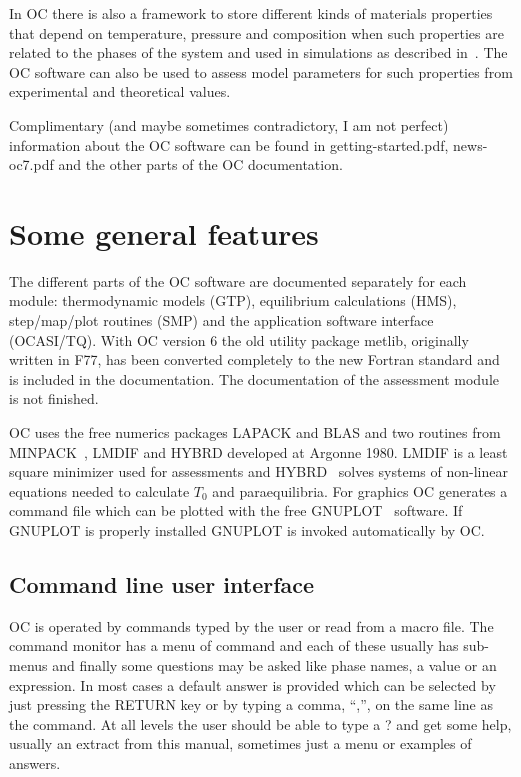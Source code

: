 \documentclass[11pt]{article}
\begin{document}
In OC there is also a framework to store different kinds of materials
properties that depend on temperature, pressure and composition when
such properties are related to the phases of the system and used in
simulations as described in~\cite{20Her}.  The OC software can also be
used to assess model parameters for such properties from experimental
and theoretical values.

Complimentary (and maybe sometimes contradictory, I am not perfect)
information about the OC software can be found in getting-started.pdf,
news-oc7.pdf and the other parts of the OC documentation.

\section{Some general features}

The different parts of the OC software are documented separately for
each module: thermodynamic models (GTP), equilibrium calculations
(HMS), step/map/plot routines (SMP) and the application software
interface (OCASI/TQ).  With OC version 6 the old utility package
metlib, originally written in F77, has been converted completely to
the new Fortran standard and is included in the documentation.  The
documentation of the assessment module is not finished.

OC uses the free numerics packages LAPACK and BLAS and two routines
from MINPACK~\cite{lmdif}, LMDIF and HYBRD developed at Argonne 1980.
LMDIF is a least square minimizer used for assessments and
HYBRD~\cite{lmdif} solves systems of non-linear equations needed to
calculate $T_0$ and paraequilibria.  For graphics OC generates a
command file which can be plotted with the free GNUPLOT~\cite{gnuplot}
software.  If GNUPLOT is properly installed GNUPLOT is invoked
automatically by OC.

\subsection{Command line user interface}

OC is operated by commands typed by the user or read from a macro
file.  The command monitor has a menu of command and each of these
usually has sub-menus and finally some questions may be asked like
phase names, a value or an expression.  In most cases a default answer
is provided which can be selected by just pressing the RETURN key or
by typing a comma, ``,'', on the same line as the command.  At all
levels the user should be able to type a ? and get some help, usually
an extract from this manual, sometimes just a menu or examples of
answers.
\end{document}
